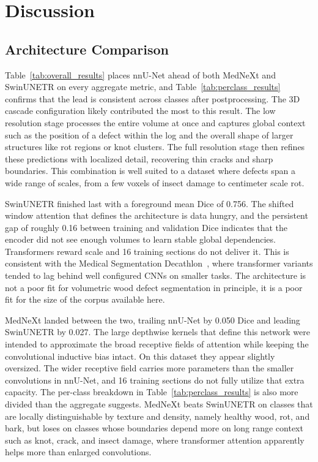 \chapter{Discussion}

\section{Architecture Comparison}

Table~\ref{tab:overall_results} places nnU-Net ahead of both MedNeXt and SwinUNETR on every aggregate metric, and Table~\ref{tab:perclass_results} confirms that the lead is consistent across classes after postprocessing. The 3D cascade configuration likely contributed the most to this result. The low resolution stage processes the entire volume at once and captures global context such as the position of a defect within the log and the overall shape of larger structures like rot regions or knot clusters. The full resolution stage then refines these predictions with localized detail, recovering thin cracks and sharp boundaries. This combination is well suited to a dataset where defects span a wide range of scales, from a few voxels of insect damage to centimeter scale rot.

SwinUNETR finished last with a foreground mean Dice of 0.756. The shifted window attention that defines the architecture is data hungry, and the persistent gap of roughly 0.16 between training and validation Dice indicates that the encoder did not see enough volumes to learn stable global dependencies. Transformers reward scale and 16 training sections do not deliver it. This is consistent with the Medical Segmentation Decathlon~\cite{antonelli2022msd}, where transformer variants tended to lag behind well configured CNNs on smaller tasks. The architecture is not a poor fit for volumetric wood defect segmentation in principle, it is a poor fit for the size of the corpus available here.

MedNeXt landed between the two, trailing nnU-Net by 0.050 Dice and leading SwinUNETR by 0.027. The large depthwise kernels that define this network were intended to approximate the broad receptive fields of attention while keeping the convolutional inductive bias intact. On this dataset they appear slightly oversized. The wider receptive field carries more parameters than the smaller convolutions in nnU-Net, and 16 training sections do not fully utilize that extra capacity. The per-class breakdown in Table~\ref{tab:perclass_results} is also more divided than the aggregate suggests. MedNeXt beats SwinUNETR on classes that are locally distinguishable by texture and density, namely healthy wood, rot, and bark, but loses on classes whose boundaries depend more on long range context such as knot, crack, and insect damage, where transformer attention apparently helps more than enlarged convolutions.

